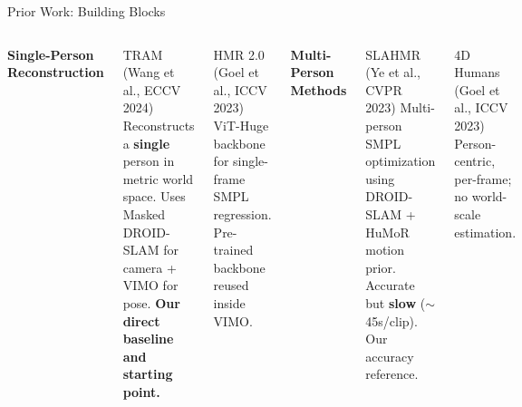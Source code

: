\documentclass[aspectratio=169,11pt]{beamer}
\begin{document}
\begin{frame}{Prior Work: Building Blocks}
  \begin{columns}[T]
      \textbf{\textcolor{tamumaroon}{Single-Person Reconstruction}}
      \vspace{0.4em}
      \begin{block}{TRAM \textnormal{\small (Wang et al., ECCV 2024)}}
        \small Reconstructs a \textbf{single} person in metric world space.
        Uses Masked DROID-SLAM for camera + VIMO for pose.
        \textbf{Our direct baseline and starting point.}
      \end{block}
      \vspace{0.4em}
      \begin{block}{HMR 2.0 \textnormal{\small (Goel et al., ICCV 2023)}}
        \small ViT-Huge backbone for single-frame SMPL regression.
        Pre-trained backbone reused inside VIMO.
      \end{block}

      \textbf{\textcolor{tamumaroon}{Multi-Person Methods}}
      \vspace{0.4em}
      \begin{block}{SLAHMR \textnormal{\small (Ye et al., CVPR 2023)}}
        \small Multi-person SMPL optimization using DROID-SLAM + HuMoR motion prior.
        Accurate but \textbf{slow} ($\sim$45s/clip). Our accuracy reference.
      \end{block}
      \vspace{0.4em}
      \begin{block}{4D Humans \textnormal{\small (Goel et al., ICCV 2023)}}
        \small Person-centric, per-frame; no world-scale estimation.
      \end{block}
  \end{columns}
\end{frame}
\end{document}
